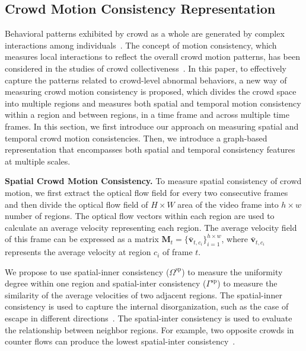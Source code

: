 \documentclass[journal]{IEEEtran}
\begin{document}
\subsection{Crowd Motion Consistency Representation}

\vskip 0.03in
Behavioral patterns exhibited by crowd as a whole are generated by complex interactions among individuals~\cite{moussaid2009collective}. The concept of motion consistency, which measures local interactions to reflect the overall crowd motion patterns, has been considered in the studies of crowd collectiveness~\cite{zhou2013measuring,chen2017anchor,zou2018measuring,li2020quantifying}. In this paper, to effectively capture the patterns related to crowd-level abnormal behaviors, a new way of measuring crowd motion consistency is proposed, which divides the crowd space into multiple regions and measures both spatial and temporal motion consistency within a region and between regions, in a time frame and across multiple time frames. In this section, we first introduce our approach on measuring spatial and temporal crowd motion consistencies.  Then, we introduce a graph-based representation that encompasses both spatial and temporal consistency features at multiple scales.

\vskip 0.03in
\noindent\textbf{Spatial Crowd Motion Consistency.}
To measure spatial consistency of crowd motion, we first extract the optical flow field for every two consecutive frames and then divide the optical flow field of $H\times W$ area of the video frame into $h \times w$ number of regions. The optical flow vectors within each region are used to calculate an average velocity representing each region. The average velocity field of this frame can be expressed as a matrix $\mathbf{M}_t = \{\mathbf{\bar{v}}_{t,c_i}\}_{i=1}^{h \times w}$, where $\mathbf{\bar{v}}_{t,c_i} $ represents the average velocity at region $c_i$ of frame $t$.

We propose to use spatial-inner consistency ($ \Omega^{\mathrm{sp}} $) to measure the uniformity degree within one region and spatial-inter consistency ($ \Gamma^{\mathrm{sp}} $) to measure the similarity of the average velocities of two adjacent regions. The spatial-inner consistency is used to capture the internal disorganization, such as the case of escape in different directions~\cite{zhao2019panic}. The spatial-inter consistency is used to evaluate the relationship between neighbor regions. For example, two opposite crowds in counter flows can produce the lowest spatial-inter consistency~\cite{crociani2017micro}.
\end{document}
